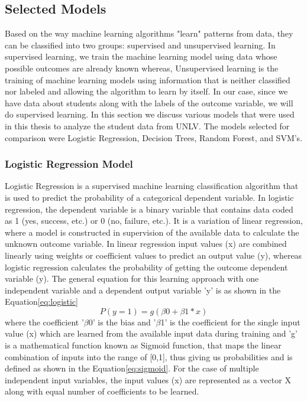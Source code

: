 \documentclass[11pt,openright]{report}
\begin{document}
\subsection{Selected Models}
Based on the way machine learning algorithms "learn" patterns from data, they can be classified into two groups: supervised and unsupervised learning. In supervised learning, we train the machine learning model using data whose possible outcomes are already known whereas, Unsupervised learning is the training of machine learning models using information that is neither classified nor labeled and allowing the algorithm to learn by itself. 
In our case, since we have data about students along with the labels of the outcome variable, we will do supervised learning. In this section we discuss various models that were used in this thesis to analyze the student data from UNLV. The models selected for comparison were Logistic Regression, Decision Trees, Random Forest, and SVM's.

\subsubsection {Logistic Regression Model}

Logistic Regression is a supervised machine learning classification algorithm that is used to predict the probability of a categorical dependent variable. In logistic regression, the dependent variable is a binary variable that contains data coded as 1 (yes, success, etc.) or 0 (no, failure, etc.). It is a variation of linear regression, where a model is constructed in supervision of the available data to calculate the unknown outcome variable. In linear regression input values (x) are combined linearly using weights or coefficient values to predict an output value (y), whereas logistic regression calculates the probability of getting the outcome dependent variable (y). The general equation for this learning approach with one independent variable and a dependent output variable 'y' is as shown in the Equation\ref{eq:logistic} 
\begin{equation}
 P(y=1)= g(\beta0+\beta1 *x )  \label{eq:logistic} 
 \end{equation}
 where the coefficient '$\beta$0' is the bias and '$\beta$1'  is the coefficient for the single input value (x) which are learned from the available input data during training and 'g' is a mathematical function known as Sigmoid function, that maps the linear combination of inputs into the range of [0,1], thus giving us probabilities and is defined as shown in the Equation\ref{eq:sigmoid}. For the case of multiple independent input variables, the input values (x) are represented as a vector X along with equal number of coefficients to be learned.
 
\end{document}
